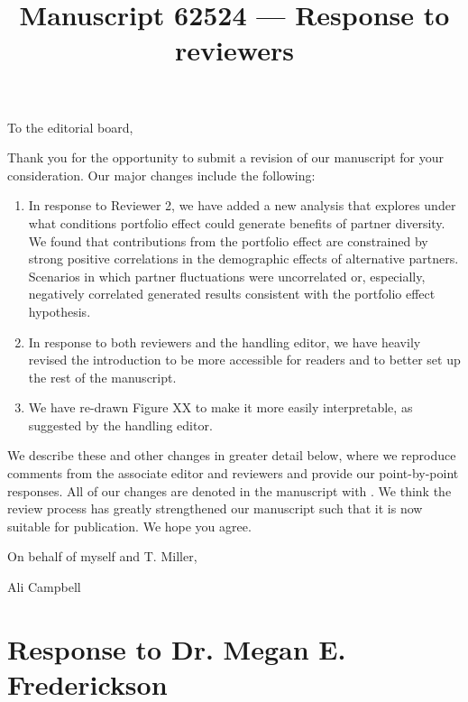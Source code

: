 \documentclass[12pt]{article}
\newcommand{\revise}[1]{{\color{blue}{#1}}}
\begin{document}
\title{Manuscript 62524 --- Response to reviewers}

\maketitle
\noindent To the editorial board,

Thank you for the opportunity to submit a revision of our manuscript for your consideration. Our major changes include the following:
\begin{enumerate}
	\item In response to Reviewer 2, we have added a new analysis that explores under what conditions portfolio effect could generate benefits of partner diversity. We found that contributions from the portfolio effect are constrained by strong positive correlations in the demographic effects of alternative partners. Scenarios in which partner fluctuations were uncorrelated or, especially, negatively correlated generated results consistent with the portfolio effect hypothesis.
	\item In response to both reviewers and the handling editor, we have heavily revised the introduction to be more accessible for readers and to better set up the rest of the manuscript.
	\item We have re-drawn Figure XX to make it more easily interpretable, as suggested by the handling editor.
\end{enumerate}

We describe these and other changes in greater detail below, where we reproduce comments from the associate editor and reviewers and provide our point-by-point responses. 
All of our changes are denoted in the manuscript with \revise{blue font}.
We think the review process has greatly strengthened our manuscript such that it is now suitable for publication.
We hope you agree. 

\vspace{2em}
\hfill On behalf of myself and T. Miller,

\hfill Ali Campbell
\newpage


\section{Response to Dr. Megan E. Frederickson}
\vspace{-2em}
\end{document}
